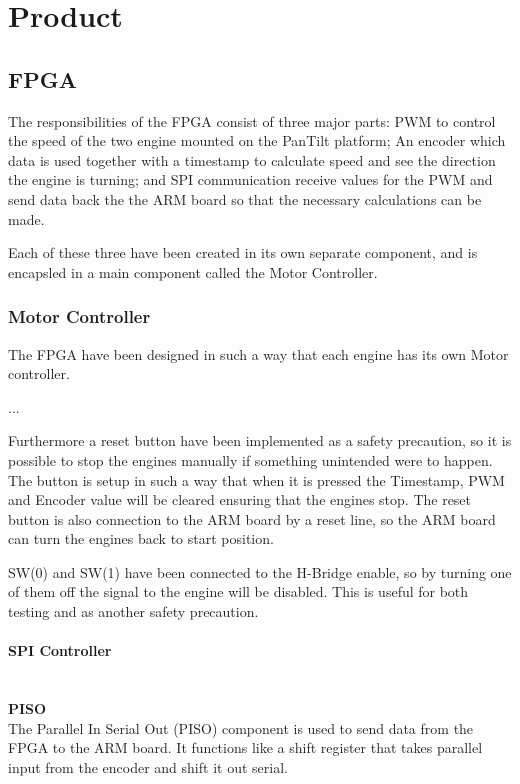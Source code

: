 \documentclass[rapport.tex]{subfiles}
\begin{document}
\section{Product}

\subsection{FPGA}
The responsibilities of the FPGA consist of three major parts: PWM to control the speed of the two engine mounted on the PanTilt platform; An encoder which data is used together with a timestamp to calculate speed and see the direction the engine is turning; and SPI communication receive values for the PWM and send data back the the ARM board so that the necessary calculations can be made.

Each of these three have been created in its own separate component, and is encapsled in a main component called the Motor Controller.


\subsubsection{Motor Controller}

The FPGA have been designed in such a way that each engine has its own Motor controller.

...

Furthermore a reset button have been implemented as a safety precaution, so it is possible to stop the engines manually if something unintended were to happen. The button is setup in such a way that when it is pressed the Timestamp, PWM and Encoder value will be cleared ensuring that the engines stop. The reset button is also connection to the ARM board by a reset line, so the ARM board can turn the engines back to start position.

SW(0) and SW(1) have been connected to the H-Bridge enable, so by turning one of them off the signal to the engine will be disabled. This is useful for both testing and as another safety precaution.

\paragraph{SPI Controller}\mbox{}\\

\textbf{PISO}\\
The Parallel In Serial Out (PISO) component is used to send data from the FPGA to the ARM board. It functions like a shift register that takes parallel input from the encoder and shift it out serial.
\end{document}
